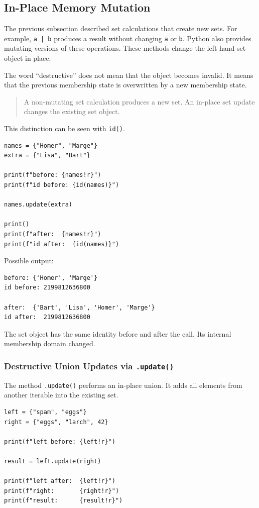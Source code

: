 \subsection{In-Place Memory Mutation}

The previous subsection described set calculations that create new sets. For example, \texttt{a | b} produces a result without changing \texttt{a} or \texttt{b}. Python also provides mutating versions of these operations. These methods change the left-hand set object in place.

The word ``destructive'' does not mean that the object becomes invalid. It means that the previous membership state is overwritten by a new membership state.

\begin{quote}
A non-mutating set calculation produces a new set. An in-place set update changes the existing set object.
\end{quote}

This distinction can be seen with \texttt{id()}.

\begin{verbatim}
names = {"Homer", "Marge"}
extra = {"Lisa", "Bart"}

print(f"before: {names!r}")
print(f"id before: {id(names)}")

names.update(extra)

print()
print(f"after:  {names!r}")
print(f"id after:  {id(names)}")
\end{verbatim}

Possible output:

\begin{verbatim}
before: {'Homer', 'Marge'}
id before: 2199812636800

after:  {'Bart', 'Lisa', 'Homer', 'Marge'}
id after:  2199812636800
\end{verbatim}

The set object has the same identity before and after the call. Its internal membership domain changed.

\subsubsection{Destructive Union Updates via \texttt{.update()}}

The method \texttt{.update()} performs an in-place union. It adds all elements from another iterable into the existing set.

\begin{verbatim}
left = {"spam", "eggs"}
right = {"eggs", "larch", 42}

print(f"left before: {left!r}")

result = left.update(right)

print(f"left after:  {left!r}")
print(f"right:       {right!r}")
print(f"result:      {result!r}")
\end{verbatim}


